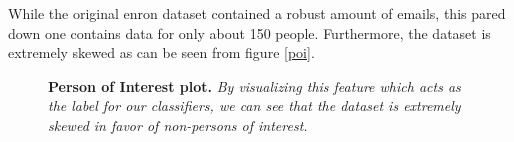 \documentclass[twoside,openright,titlepage,numbers=noenddot,headinclude,%
               footinclude=true,cleardoublepage=empty,abstractoff,BCOR=5mm,%
               paper=a4,fontsize=11pt,ngerman,american]{scrreprt}
\numberwithin{theorem}{chapter}
\numberwithin{definition}{chapter}
\numberwithin{algorithm}{chapter}
\numberwithin{figure}{chapter}
\numberwithin{table}{chapter}
\numberwithin{equation}{chapter}
\begin{document}
While the original enron dataset contained a robust amount of emails, this pared down one contains data for only about 150 people. Furthermore, the dataset is extremely skewed as can be seen from figure \ref{poi}.
\begin{figure}[!hbtp]
\centering
    
    \caption{\textbf{Person of Interest plot.}\textit{ By visualizing this feature which acts as the label for our classifiers, we can see that the dataset is extremely skewed in favor of non-persons of interest.}}
\end{figure}
\end{document}
